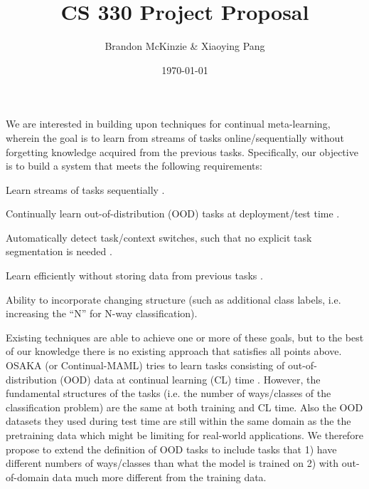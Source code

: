 \documentclass[12pt]{article}
\title{\vspace{-10mm}\fontsize{24pt}{8pt}\selectfont\textbf{CS 330 Project Proposal}\vspace*{-4mm}}
\author{Brandon McKinzie \& Xiaoying Pang}
\date{\today}
\begin{document}
\maketitle

We are interested in building upon techniques for continual meta-learning, wherein the goal is to learn from streams of tasks online/sequentially without forgetting knowledge acquired from the previous tasks. Specifically, our objective is to build a system that meets the following requirements:

\begin{compactenum}
	\item Learn streams of tasks sequentially \cite{FinnOnline}.
	\item Continually learn out-of-distribution (OOD) tasks at deployment/test time \cite{FinnOnline, mole, osaka}.
	\item Automatically detect task/context switches, such that no explicit task segmentation is needed \cite{osaka}.
	\item Learn efficiently without storing data from previous tasks \cite{osaka, mole, moca}. 
	\item Ability to incorporate changing structure (such as additional class labels, i.e. increasing the ``N'' for N-way classification). 
\end{compactenum}


Existing techniques are able to achieve one or more of these goals, but to the best of our knowledge there is no existing approach that satisfies all points above. OSAKA (or Continual-MAML) tries to learn tasks consisting of out-of-distribution (OOD) data at continual learning (CL) time \cite{osaka}. However, the fundamental structures of the tasks (i.e. the number of ways/classes of the classification problem) are the same at both training and CL time. Also the OOD datasets they used during test time are still within the same domain as the the pretraining data which might be limiting for real-world applications. We therefore propose to extend the definition of OOD tasks to include tasks that 1) have different numbers of ways/classes than what the model is trained on 2) with out-of-domain data much more different from the training data.
\end{document}
